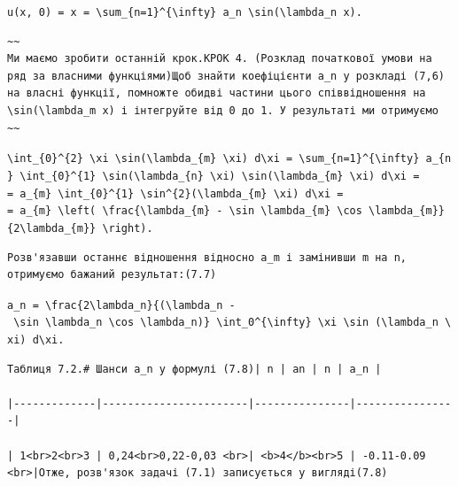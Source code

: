 \documentclass[
  ukrainian,
]{article}
\begin{document}
\texttt{u(x,\ 0)\ =\ x\ =\ \textbackslash{}sum\_\{n=1\}\^{}\{\textbackslash{}infty\}\ a\_n\ \textbackslash{}sin(\textbackslash{}lambda\_n\ x).}

\begin{verbatim}
~~
Ми маємо зробити останній крок.КРОК 4. (Розклад початкової умови на ряд за власними функціями)Щоб знайти коефіцієнти a_n у розкладі (7,6) на власні функції, помножте обидві частини цього співвідношення на \sin(\lambda_m x) і інтегруйте від 0 до 1. У результаті ми отримуємо
~~
\end{verbatim}

\texttt{\textbackslash{}int\_\{0\}\^{}\{2\}\ \textbackslash{}xi\ \textbackslash{}sin(\textbackslash{}lambda\_\{m\}\ \textbackslash{}xi)\ d\textbackslash{}xi\ =\ \textbackslash{}sum\_\{n=1\}\^{}\{\textbackslash{}infty\}\ a\_\{n\}\ \textbackslash{}int\_\{0\}\^{}\{1\}\ \textbackslash{}sin(\textbackslash{}lambda\_\{n\}\ \textbackslash{}xi)\ \textbackslash{}sin(\textbackslash{}lambda\_\{m\}\ \textbackslash{}xi)\ d\textbackslash{}xi\ =}
\texttt{=\ a\_\{m\}\ \textbackslash{}int\_\{0\}\^{}\{1\}\ \textbackslash{}sin\^{}\{2\}(\textbackslash{}lambda\_\{m\}\ \textbackslash{}xi)\ d\textbackslash{}xi\ =}
\texttt{=\ a\_\{m\}\ \textbackslash{}left(\ \textbackslash{}frac\{\textbackslash{}lambda\_\{m\}\ -\ \textbackslash{}sin\ \textbackslash{}lambda\_\{m\}\ \textbackslash{}cos\ \textbackslash{}lambda\_\{m\}\}\{2\textbackslash{}lambda\_\{m\}\}\ \textbackslash{}right).}

\begin{verbatim}
Розв'язавши останнє відношення відносно a_m і замінивши m на n, отримуємо бажаний результат:(7.7)
\end{verbatim}

\texttt{a\_n\ =\ \textbackslash{}frac\{2\textbackslash{}lambda\_n\}\{(\textbackslash{}lambda\_n\ -\ \textbackslash{}sin\ \textbackslash{}lambda\_n\ \textbackslash{}cos\ \textbackslash{}lambda\_n)\}\ \textbackslash{}int\_0\^{}\{\textbackslash{}infty\}\ \textbackslash{}xi\ \textbackslash{}sin\ (\textbackslash{}lambda\_n\ \textbackslash{}xi)\ d\textbackslash{}xi.}

\begin{verbatim}
Таблиця 7.2.# Шанси a_n у формулі (7.8)| n | an | n | a_n |

|-------------|-----------------------|---------------|----------------|

| 1<br>2<br>3 | 0,24<br>0,22-0,03 <br>| <b>4</b><br>5 | -0.11-0.09 <br>|Отже, розв'язок задачі (7.1) записується у вигляді(7.8)
\end{verbatim}
\end{document}
